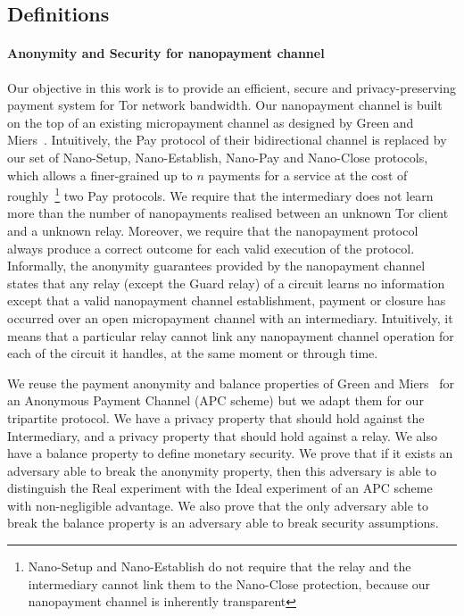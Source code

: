 
\subsection{Definitions}

\paragraph*{Anonymity and Security for nanopayment channel}

Our objective in this work is to provide an efficient, secure and privacy-preserving payment system for Tor network bandwidth. Our nanopayment channel is built on the top of an existing micropayment channel as designed by Green and Miers~\cite{green2017bolt}. Intuitively, the Pay protocol of their bidirectional channel is replaced by our set of Nano-Setup, Nano-Establish, Nano-Pay and Nano-Close protocols, which allows a finer-grained up to $n$ payments for a service at the cost of roughly~\footnote{Nano-Setup and Nano-Establish do not require that the relay and the intermediary cannot link them to the Nano-Close protection, because our nanopayment channel is inherently transparent} two Pay protocols.
We require that the intermediary does not learn more than the number of nanopayments realised between an unknown Tor client and a unknown relay. Moreover, we require that the nanopayment protocol always produce a correct outcome for each valid execution of the protocol.
Informally, the anonymity guarantees provided by the nanopayment channel states that any relay (except the Guard relay) of a circuit learns no information except that a valid nanopayment channel establishment, payment or closure has occurred over an open micropayment channel with an intermediary. Intuitively, it means that a particular relay cannot link any nanopayment channel operation for each of the circuit it handles, at the same moment or through time.

We reuse the payment anonymity and balance properties of Green and Miers~\cite{bolt-eprint} for an Anonymous Payment Channel (APC scheme) but we adapt them for our tripartite protocol. We have a privacy property that should hold against the Intermediary, and a privacy property that should hold against a relay. We also have a balance property to define monetary security.
We prove that if it exists an adversary able to break the anonymity property, then this adversary is able to distinguish the Real experiment with the Ideal experiment of an APC scheme with non-negligible advantage. We also prove that the only adversary able to break the balance property is an adversary able to break security assumptions.

